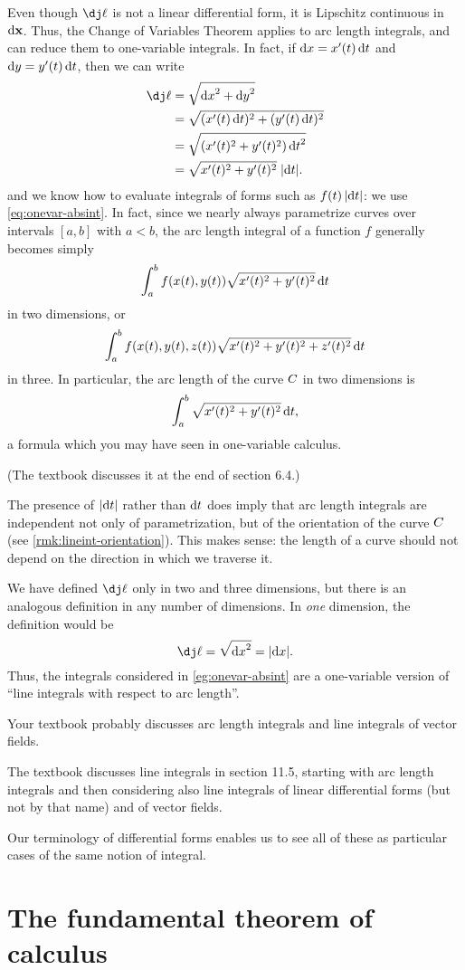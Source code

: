 \documentclass[12pt]{amsart}
\begin{document}
Even though $\dl$ is not a linear differential form, it is Lipschitz continuous in ${\mathrm{d} \mathbf{x}}$.
Thus, the Change of Variables Theorem applies to arc length integrals, and can reduce them to one-variable integrals.
In fact, if ${\mathrm{d} x} = x'(t) \,{\mathrm{d} t}$ and ${\mathrm{d} y} = y'(t)\,{\mathrm{d} t}$, then we can write
\begin{align*}
  \dl &= \sqrt{\dx^2+\dy^2}\\
  &= \sqrt{(x'(t)\,\dt)^2 + (y'(t)\,\dt)^2}\\
  &= \sqrt{(x'(t)^2 + y'(t)^2) \,\dt^2}\\
  &= \sqrt{x'(t)^2 + y'(t)^2} \;|\dt|.
\end{align*}
and we know how to evaluate integrals of forms such as $f(t)\,|{\mathrm{d} t}|$: we use \cref{eq:onevar-absint}.
In fact, since we nearly always parametrize curves over intervals $[a,b]$ with $a<b$, the arc length integral of a function $f$ generally becomes simply
\[ \int_a^b f(x(t),y(t)) \sqrt{x'(t)^2 + y'(t)^2} \,{\mathrm{d} t} \]
in two dimensions, or
\[ \int_a^b f(x(t),y(t),z(t)) \sqrt{x'(t)^2 + y'(t)^2+z'(t)^2} \,{\mathrm{d} t} \]
in three.
In particular, the arc length of the curve $C$ in two dimensions is
\[ \int_a^b \sqrt{x'(t)^2 + y'(t)^2} \,{\mathrm{d} t}, \]
a formula which you may have seen in one-variable calculus.
\begin{stewart}(The textbook discusses it at the end of section 6.4.)\end{stewart}


\begin{rmk}
  The presence of $|{\mathrm{d} t}|$ rather than ${\mathrm{d} t}$ does imply that arc length integrals are independent not only of parametrization, but of the orientation of the curve $C$ (see \cref{rmk:lineint-orientation}).
  This makes sense: the length of a curve should not depend on the direction in which we traverse it.
\end{rmk}

\begin{rmk}
  We have defined $\dl$ only in two and three dimensions, but there is an analogous definition in any number of dimensions.
  In \emph{one} dimension, the definition would be
  \[ \dl = \sqrt{\dx^2} = |\dx|. \]
  Thus, the integrals considered in \cref{eg:onevar-absint} are a one-variable version of ``line integrals with respect to arc length''.
\end{rmk}

\begin{notextbook}Your textbook probably discusses arc length integrals and line integrals of vector fields.\end{notextbook}
\begin{stewart}The textbook discusses line integrals in section 11.5, starting with arc length integrals and then considering also line integrals of linear differential forms (but not by that name) and of vector fields.\end{stewart}
Our terminology of differential forms enables us to see all of these as particular cases of the same notion of integral.

\section{The fundamental theorem of calculus}
\label{sec:lineintegral-ftc}
\end{document}
